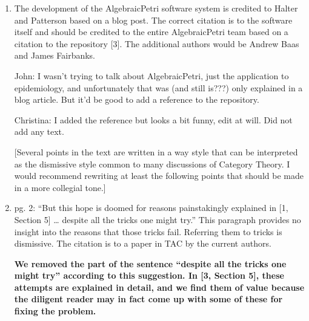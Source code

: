 \documentclass[reqno]{amsart}
\def\chris{\color{purple} Christina: }
\def\john{\color{red} John: }
\def\kenny{\color{blue} Kenny: }
\begin{document}
\begin{enumerate}
{\bf We do not know a semantics for dynamical systems that uses structured cospans; to find one would
require getting around the result at the end of Section 6.}

{\chris Should we refer to which result we are talking about? Also, I am a bit confused about the question and answer. I thought reaction networks 
can be described in both ways?}

{\kenny I'm kinda' confused by the question, too, due to its wording. Based on what Dr. Baez said in response, I think they might have meant dynamical systems instead of reaction networks in their last sentence. They even say earlier in their comment that the frameworks are isomorphic for reaction networks.}

\item The development of the AlgebraicPetri software system is credited to Halter and Patterson based on a blog post. The correct citation is to the 
software itself and should be credited to the entire AlgebraicPetri team based on a citation to the repository [3]. The additional authors would be 
Andrew Baas and James Fairbanks.

{\john I wasn't trying to talk about AlgebraicPetri, just the application to epidemiology, and unfortunately that was (and still is???) only explained 
in a blog article. But it'd be good to add a reference to the repository.}

{\chris I added the reference but looks a bit funny, edit at will. Did not add any text.}

[Several points in the text are written in a way style that can be interpreted as the dismissive style common to many discussions of Category 
Theory. I 
would recommend rewriting at least the following points that should be made in a more collegial tone.]

\item pg. 2: “But this hope is doomed for reasons painstakingly explained in [1, Section 5] … despite all the tricks one might try.” This paragraph 
provides 
no insight into the reasons that those tricks fail. Referring them to tricks is dismissive. The citation is to a paper in TAC by the current authors.

{\bf We removed the part of the sentence ``despite all the tricks one might try'' according to this suggestion. In [3, Section 5], these attempts are 
explained in detail, and we find them of value because the diligent reader may in fact come up with some of these for fixing the problem.}


\end{enumerate}
\end{document}
